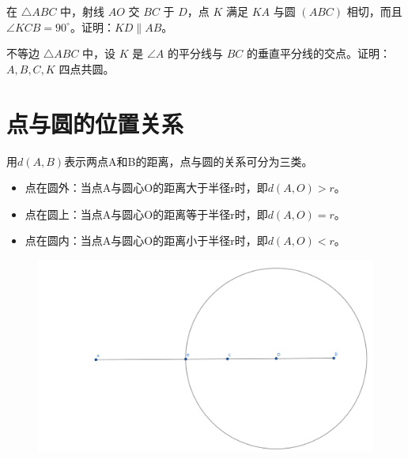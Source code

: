 \begin{exercise}
在 $\triangle ABC$ 中，射线 $AO$ 交 $BC$ 于 $D$，点 $K$ 满足 $KA$ 与圆 $(ABC)$ 相切，而且 $\angle KCB = 90^\circ$。证明：$KD \parallel AB$。
\end{exercise}



\begin{exercise}
不等边 $\triangle ABC$ 中，设 $K$ 是 $\angle A$ 的平分线与 $BC$ 的垂直平分线的交点。证明：$A, B, C, K$ 四点共圆。
\end{exercise}


\newpage 
\section{点与圆的位置关系}
用$d(A,B)$表示两点A和B的距离，点与圆的关系可分为三类。
\begin{itemize}
    \item 点在圆外：当点A与圆心O的距离大于半径r时，即$d(A,O) > r$。
    \item 点在圆上：当点A与圆心O的距离等于半径r时，即$d(A,O) = r$。
    \item 点在圆内：当点A与圆心O的距离小于半径r时，即$d(A,O) < r$。
\end{itemize}
\begin{figure}[H]
    \centering
    \includegraphics[width=0.8\linewidth]{figures/点与圆.png}
\end{figure}

